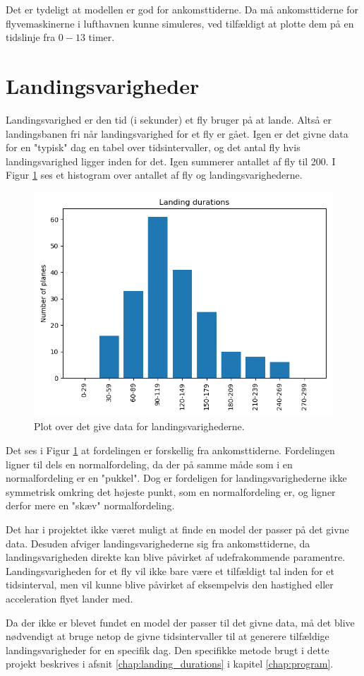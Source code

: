 Det er tydeligt at modellen er god for ankomsttiderne. Da må ankomsttiderne for flyvemaskinerne i lufthavnen kunne simuleres, ved tilfældigt at plotte dem på en tidslinje fra $0 - 13$ timer.

\section{Landingsvarigheder}
Landingsvarighed er den tid (i sekunder) et fly bruger på at lande.
Altså er landingsbanen fri når landingsvarighed for et fly er gået.
Igen er det givne data for en "typisk" dag en tabel over tidsintervaller, og det antal fly hvis landingsvarighed ligger inden for det. Igen summerer antallet af fly til 200. I Figur \ref{fig:given_landing_durations_plot} ses et histogram over antallet af fly og landingsvarighederne.

\begin{figure}[h!]
	\centering
	\includegraphics[scale=0.6]{fig/img/given_landing_durations_plot.png}
	\caption{Plot over det give data for landingsvarighederne.} \label{fig:given_landing_durations_plot}
\end{figure}

Det ses i Figur \ref{fig:given_landing_durations_plot} at fordelingen er forskellig fra ankomsttiderne.
Fordelingen ligner til dels en normalfordeling, da der på samme måde som i en normalfordeling er en "pukkel".
Dog er fordeligen for landingsvarighederne ikke symmetrisk omkring det højeste punkt, som en normalfordeling er, og ligner derfor mere en "skæv" normalfordeling.

Det har i projektet ikke været muligt at finde en model der passer på det givne data.
Desuden afviger landingsvarighederne sig fra ankomsttiderne, da landingsvarigheden direkte kan blive påvirket af udefrakommende paramentre.
Landingsvarigheden for et fly vil ikke bare være et tilfældigt tal inden for et tidsinterval, men vil kunne blive påvirket af eksempelvis den hastighed eller acceleration flyet lander med. 

Da der ikke er blevet fundet en model der passer til det givne data, må det blive nødvendigt at bruge netop de givne tidsintervaller til at generere tilfældige landingsvarigheder for en specifik dag. Den specifikke metode brugt i dette projekt beskrives i afsnit \ref{chap:landing_durations} i kapitel \ref{chap:program}.
